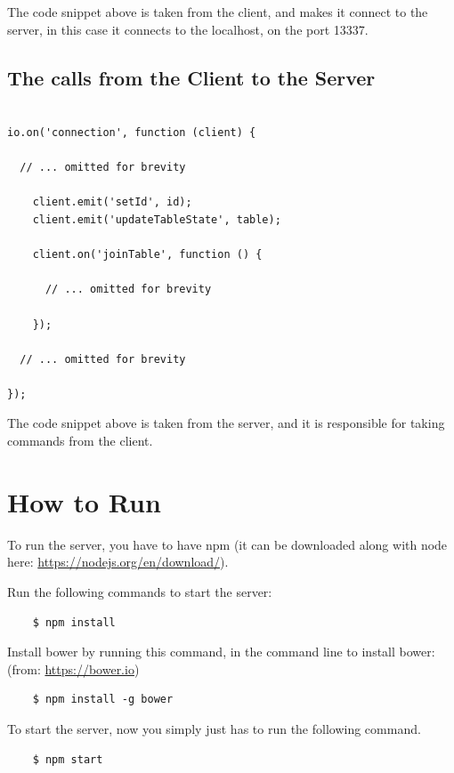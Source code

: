 \documentclass[a4paper]{article}
\begin{document}
The code snippet above is taken from the client, and makes it connect to the server, in this case it connects to the localhost, on the port 13337.


\subsection{The calls from the Client to the Server}
\begin{listing}[H]
\begin{verbatim}

io.on('connection', function (client) {

  // ... omitted for brevity

    client.emit('setId', id);
    client.emit('updateTableState', table);

    client.on('joinTable', function () {

      // ... omitted for brevity

    });

  // ... omitted for brevity

});

\end{verbatim}
\end{listing}
The code snippet above is taken from the server, and it is responsible for taking commands from the client.

\section{How to Run}
To run the server, you have to have npm (it can be downloaded along with
  node here: \url{https://nodejs.org/en/download/}).

Run the following commands to start the server:
\begin{verbatim}
	$ npm install
\end{verbatim}
  
Install bower by running this command, in the command line to install
bower: (from: \url{https://bower.io})

\begin{verbatim}
	$ npm install -g bower
\end{verbatim}

To start the server, now you simply just has to run the following command.

\begin{verbatim}
	$ npm start
\end{verbatim}
\end{document}

